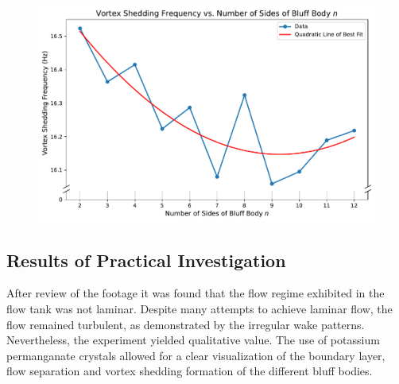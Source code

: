 \begin{figure}[H]
	\centering
	\includegraphics[width=\textwidth]{images/overall}
	\caption{}
	\label{fig:overall} 
\end{figure}


\subsection{Results of Practical Investigation}
After review of the footage it was found that the flow regime exhibited in the flow tank was not laminar. Despite many attempts to achieve laminar flow, the flow remained turbulent, as demonstrated by the irregular wake patterns. Nevertheless, the experiment yielded qualitative value. The use of potassium permanganate crystals allowed for a clear visualization of the boundary layer, flow separation and vortex shedding formation of the different bluff bodies.


